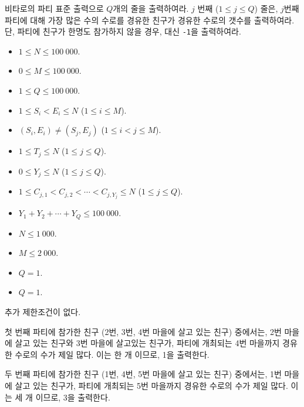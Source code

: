 \begin{problem}{비타로의 파티}
	표준 출력으로 $Q$개의 줄을 출력하여라. $j$ 번째 ($1 \le j \le Q$) 줄은, $j$번째 파티에 대해 가장 많은 수의 수로를 경유한 친구가 경유한 수로의 갯수를 출력하여라. 단, 파티에 친구가 한명도 참가하지 않을 경우, 대신 \texttt{-1}을 출력하여라.
		
	\Constraints
	
	\begin{itemize}
		\item $1 \le N \le 100\ 000$.
		\item $0 \le M \le 100\ 000$.
		\item $1 \le Q \le 100\ 000$.
		\item $1 \le S_i < E_i \le N$ ($1 \le i \le M$).
		\item $(S_i, E_i) \ne (S_j, E_j)$ ($1 \le i < j \le M$).
		\item $1 \le T_j \le N$ ($1 \le j \le Q$).
		\item $0 \le Y_j \le N$ ($1 \le j \le Q$).
		\item $1 \le C_{j, 1} < C_{j, 2}< \cdots < C_{j, Y_j} \le N$ ($1 \le j \le Q$).
		\item $Y_1 + Y_2 + \cdots + Y_Q \le 100\ 000$.
	\end{itemize}
	
	
	\begin{itemize}
		\item $N \le 1\ 000$.
		\item $M \le 2\ 000$.
		\item $Q=1$.
	\end{itemize}

	\begin{itemize}
		\item $Q=1$.
	\end{itemize}


	추가 제한조건이 없다.
	
	\Examples
	
	\begin{example}
	\end{example}
	
	첫 번째 파티에 참가한 친구 (2번, 3번, 4번 마을에 살고 있는 친구) 중에서는, 2번 마을에 살고 있는 친구와 3번 마을에 살고있는 친구가, 파티에 개최되는 4번 마을까지 경유한 수로의 수가 제일 많다. 이는 한 개 이므로, 1을 출력한다.
	
	두 번째 파티에 참가한 친구 (1번, 4번, 5번 마을에 살고 있는 친구) 중에서는, 1번 마을에 살고 있는 친구가, 파티에 개최되는 5번 마을까지 경유한 수로의 수가 제일 많다. 이는 세 개 이므로, 3을 출력한다.
	

\end{problem}
